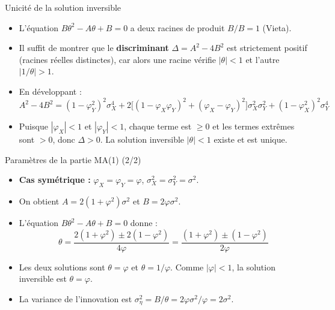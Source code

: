 \documentclass[11pt,aspectratio=169]{beamer}
\begin{document}
\begin{frame}{Unicité de la solution inversible}

\begin{itemize}

\item L'équation $B\theta^2 - A\theta + B = 0$ a deux racines de produit $B/B = 1$ (Vieta).\newline

\item Il suffit de montrer que le \textbf{discriminant} $\Delta = A^2 - 4B^2$ est strictement positif (racines réelles distinctes), car alors une racine vérifie $|\theta| < 1$ et l'autre $|1/\theta| > 1$.\newline

\item En développant :
  \[
  A^2 - 4B^2 = (1-\varphi_Y^2)^2 \sigma_X^4 + 2\big[(1-\varphi_X\varphi_Y)^2 + (\varphi_X - \varphi_Y)^2\big] \sigma_X^2 \sigma_Y^2 + (1-\varphi_X^2)^2 \sigma_Y^4
  \]\newline

\item Puisque $|\varphi_X| < 1$ et $|\varphi_Y| < 1$, chaque terme est $\geq 0$ et les termes extrêmes sont $> 0$, donc $\Delta > 0$. La solution inversible $|\theta| < 1$ existe et est unique.

\end{itemize}

\end{frame}

\begin{frame}{Paramètres de la partie MA(1) (2/2)}

\begin{itemize}

\item \textbf{Cas symétrique :} $\varphi_X = \varphi_Y = \varphi$, $\sigma_X^2 = \sigma_Y^2 = \sigma^2$.\newline

\item On obtient $A = 2(1+\varphi^2)\sigma^2$ et $B = 2\varphi\sigma^2$.\newline

\item L'équation $B\theta^2 - A\theta + B = 0$ donne :
  \[
  \theta = \frac{2(1+\varphi^2) \pm 2(1-\varphi^2)}{4\varphi} = \frac{(1+\varphi^2) \pm (1-\varphi^2)}{2\varphi}
  \]\newline

\item Les deux solutions sont $\theta = \varphi$ et $\theta = 1/\varphi$. Comme $|\varphi| < 1$, la solution inversible est $\theta = \varphi$.\newline

\item La variance de l'innovation est $\sigma_\eta^2 = B / \theta = 2\varphi\sigma^2 / \varphi = 2\sigma^2$.

\end{itemize}

\end{frame}
\end{document}
